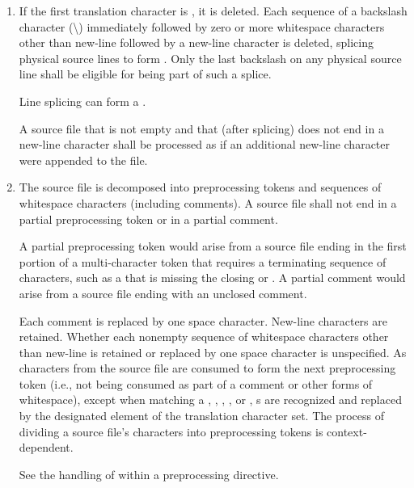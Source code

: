 \begin{enumerate}
\item
{}%
If the first translation character is ,
it is deleted.
Each sequence of a backslash character (\textbackslash)
immediately followed by
zero or more whitespace characters other than new-line followed by
a new-line character is deleted, splicing
physical source lines to form . Only the last
backslash on any physical source line shall be eligible for being part
of such a splice.
\begin{note}
Line splicing can form
a .
\end{note}
A source file that is not empty and that (after splicing)
does not end in a new-line character
shall be processed as if an additional new-line character were appended
to the file.

\item The source file is decomposed into preprocessing
tokens and sequences of whitespace characters
(including comments). A source file shall not end in a partial
preprocessing token or in a partial comment.
\begin{footnote}
A partial preprocessing
token would arise from a source file
ending in the first portion of a multi-character token that requires a
terminating sequence of characters, such as a 
that is missing the closing 
or \tcode{>}. A partial comment
would arise from a source file ending with an unclosed \tcode{/*}
comment.
\end{footnote}
Each comment is replaced by one space character. New-line characters are
retained. Whether each nonempty sequence of whitespace characters other
than new-line is retained or replaced by one space character is
unspecified.
As characters from the source file are consumed
to form the next preprocessing token
(i.e., not being consumed as part of a comment or other forms of whitespace),
except when matching a
,
,
,
, or
,
s are recognized and
replaced by the designated element of the translation character set.
The process of dividing a source file's
characters into preprocessing tokens is context-dependent.
\begin{example}
See the handling of \tcode{<} within a  preprocessing
directive.
\end{example}


\end{enumerate}
